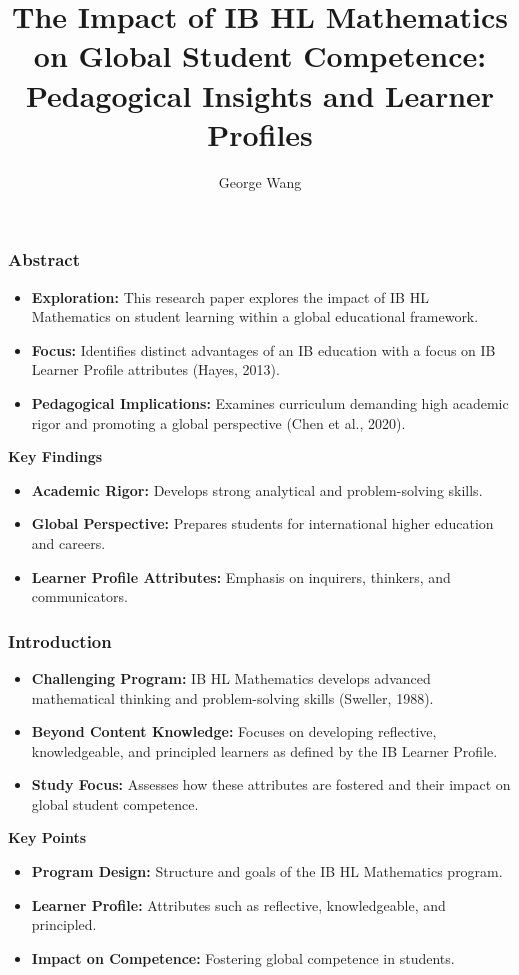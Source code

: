 \documentclass{beamer}
\title{The Impact of IB HL Mathematics on Global Student Competence: \\ Pedagogical Insights and Learner Profiles}
\author{George Wang}
\date{}
\begin{document}
\frame{\titlepage}

\begin{frame}
    \frametitle{Abstract}
    \begin{itemize}
        \item \textbf{Exploration:} This research paper explores the impact of IB HL Mathematics on student learning within a global educational framework.
        \item \textbf{Focus:} Identifies distinct advantages of an IB education with a focus on IB Learner Profile attributes (Hayes, 2013).
        \item \textbf{Pedagogical Implications:} Examines curriculum demanding high academic rigor and promoting a global perspective (Chen et al., 2020).
    \end{itemize}
    \vspace{0.3cm}
    \textbf{Key Findings}
    \begin{itemize}
        \item \textbf{Academic Rigor:} Develops strong analytical and problem-solving skills.
        \item \textbf{Global Perspective:} Prepares students for international higher education and careers.
        \item \textbf{Learner Profile Attributes:} Emphasis on inquirers, thinkers, and communicators.
      
    \end{itemize}


    \end{frame}

    \begin{frame}
      \frametitle{Introduction}
      \begin{itemize}
          \item \textbf{Challenging Program:} IB HL Mathematics develops advanced mathematical thinking and problem-solving skills (Sweller, 1988).
          \item \textbf{Beyond Content Knowledge:} Focuses on developing reflective, knowledgeable, and principled learners as defined by the IB Learner Profile.
          \item \textbf{Study Focus:} Assesses how these attributes are fostered and their impact on global student competence.
      \end{itemize}
      \vspace{0.3cm}
      \textbf{Key Points}
      \begin{itemize}
          \item \textbf{Program Design:} Structure and goals of the IB HL Mathematics program.
          \item \textbf{Learner Profile:} Attributes such as reflective, knowledgeable, and principled.
          \item \textbf{Impact on Competence:} Fostering global competence in students.
      \end{itemize}

\end{frame}
\end{document}
